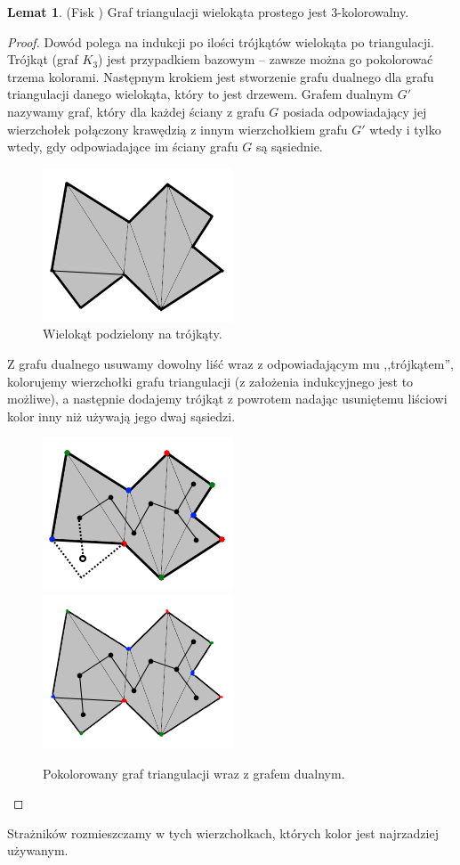 \documentclass[brudnopis]{xmgr}
\theoremstyle{definition}
\newtheorem{Lemat}{Lemat}
\begin{document}
\begin{Lemat} (Fisk \cite{fisk})
Graf triangulacji wielokąta prostego jest $3$-kolorowalny.
\end{Lemat}
\begin{proof}
	Dowód polega na indukcji po ilości trójkątów wielokąta po triangulacji. Trójkąt (graf $K_3$) jest przypadkiem bazowym -- zawsze można go pokolorować trzema kolorami. Następnym krokiem jest stworzenie grafu  dualnego dla grafu triangulacji danego wielokąta, który to jest drzewem. Grafem dualnym $G'$ nazywamy graf, który dla każdej ściany z grafu $G$ posiada odpowiadający jej wierzchołek połączony krawędzią z innym wierzchołkiem grafu $G'$ wtedy i tylko wtedy, gdy odpowiadające im ściany grafu $G$ są sąsiednie.
	\begin{figure}[ht!]
	  \centering
	  \includegraphics{rysunki/dual.png}
	    \caption{Wielokąt podzielony na trójkąty.}
	\end{figure} 
	Z grafu dualnego usuwamy dowolny liść wraz z odpowiadającym mu ,,trójkątem'', kolorujemy wierzchołki grafu triangulacji (z założenia indukcyjnego jest to możliwe), a następnie dodajemy trójkąt z powrotem nadając usuniętemu liściowi kolor inny niż używają jego dwaj sąsiedzi.
  \begin{figure}[ht!]
    \centering
      \includegraphics{rysunki/dual_kolor.png} 
      \includegraphics{rysunki/dual_caly_kolor.png}
      \caption{Pokolorowany graf triangulacji wraz z grafem dualnym.}
  \end{figure} 
\end{proof}
	Strażników rozmieszczamy w tych wierzchołkach, których kolor jest najrzadziej używanym.
\end{document}
